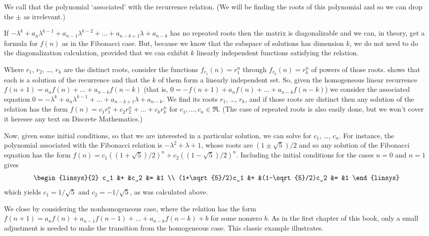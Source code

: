 We call that the polynomial `associated' with the recurrence relation.
(We will be finding the roots of this polynomial and so we can drop the $\pm$
as irrelevant.)

If  
$-\lambda^k+a_n\lambda^{k-1}+a_{n-1}\lambda^{k-2}
   +\dots+a_{n-k+1}\lambda+a_{n-k}$
has no repeated roots 
then the matrix is diagonalizable
and we can, in theory, get a formula for $f(n)$ as in the Fibonacci case.
But, because we know that the subspace of solutions has dimension $k$, 
we do not need to do the diagonalization calculation, provided that 
we can exhibit $k$ linearly independent functions satisfying the relation.

Where $r_1$, $r_2$, \ldots, $r_k$ are the distinct roots,
consider the functions $f_{r_1}(n)=r_1^n$ through
$f_{r_k}(n)=r_k^n$ of powers of those roots.
 shows that 
each is a solution of the recurrence and that the $k$ of them form a 
linearly independent set.
So, given the homogeneous linear recurrence
$f(n+1)=a_nf(n)+\dots+a_{n-k}f(n-k)$
(that is, $0=-f(n+1)+a_nf(n)+\dots+a_{n-k}f(n-k)$)
we consider the associated equation
$0=-\lambda^k+a_n\lambda^{k-1}+\dots+a_{n-k+1}\lambda+a_{n-k}$.
We find its roots $r_1$, \ldots, $r_k$, and if those roots are distinct then
any solution of the relation has the form 
$f(n)=c_1r_1^n+c_2r_2^n+\dots+c_kr_k^n$ for $c_1, \dots, c_n\in\Re$.
(The case of repeated roots is also easily done, but we won't
cover it here\Dash see any text on Discrete Mathematics.)

Now, given some initial conditions, 
so that we are interested in a particular solution, 
we can solve for $c_1$, \ldots, $c_n$.
For instance, the polynomial associated with the Fibonacci relation is
$-\lambda^2+\lambda+1$, whose roots are $(1\pm\sqrt{5})/2$
and so any solution of the Fibonacci equation 
has the form $f(n)=c_1((1+\sqrt{5})/2)^n+c_2((1-\sqrt{5})/2)^n$.
Including the initial conditions for the cases $n=0$ and $n=1$ gives
\begin{equation*}
  \begin{linsys}{2}
    c_1               &+  &c_2               &=  &1  \\
    (1+\sqrt{5}/2)c_1 &+  &(1-\sqrt{5}/2)c_2 &=  &1
  \end{linsys}
\end{equation*}
which yields $c_1=1/\sqrt{5}$ and $c_2=-1/\sqrt{5}$, as was calculated above.

We close by considering the nonhomogeneous case,
where the relation has the form
$f(n+1)=a_nf(n)+a_{n-1}f(n-1)+\dots+a_{n-k}f(n-k)+b$ for some nonzero $b$.
As in the first chapter of this book, only a small adjustment is needed
to make the transition from the homogeneous case.
This classic example illustrates.

